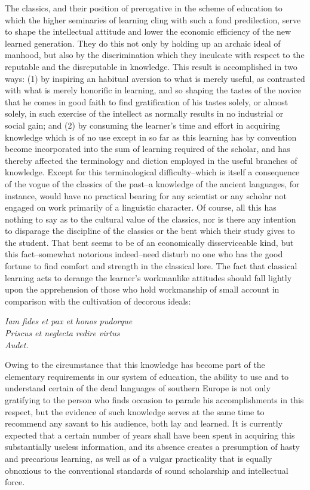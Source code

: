 \documentclass[12pt]{report}
\begin{document}
The classics, and their position of prerogative in the scheme of
education to which the higher seminaries of learning cling with such a
fond predilection, serve to shape the intellectual attitude and lower
the economic efficiency of the new learned generation. They do this
not only by holding up an archaic ideal of manhood, but also by the
discrimination which they inculcate with respect to the reputable and
the disreputable in knowledge. This result is accomplished in two ways:
(1) by inspiring an habitual aversion to what is merely useful, as
contrasted with what is merely honorific in learning, and so shaping the
tastes of the novice that he comes in good faith to find gratification
of his tastes solely, or almost solely, in such exercise of the
intellect as normally results in no industrial or social gain; and (2)
by consuming the learner's time and effort in acquiring knowledge which
is of no use except in so far as this learning has by convention become
incorporated into the sum of learning required of the scholar, and has
thereby affected the terminology and diction employed in the useful
branches of knowledge. Except for this terminological difficulty--which
is itself a consequence of the vogue of the classics of the past--a
knowledge of the ancient languages, for instance, would have no
practical bearing for any scientist or any scholar not engaged on work
primarily of a linguistic character. Of course, all this has nothing to
say as to the cultural value of the classics, nor is there any intention
to disparage the discipline of the classics or the bent which their
study gives to the student. That bent seems to be of an economically
disserviceable kind, but this fact--somewhat notorious indeed--need
disturb no one who has the good fortune to find comfort and strength in
the classical lore. The fact that classical learning acts to derange
the learner's workmanlike attitudes should fall lightly upon the
apprehension of those who hold workmanship of small account in
comparison with the cultivation of decorous ideals: 
\begin{displayquote}
\emph{Iam fides et pax et honos pudorque \\
Priscus et neglecta redire virtus \\
Audet.}
\end{displayquote}
Owing to the circumstance that this knowledge has become part of the
elementary requirements in our system of education, the ability to use
and to understand certain of the dead languages of southern Europe
is not only gratifying to the person who finds occasion to parade his
accomplishments in this respect, but the evidence of such knowledge
serves at the same time to recommend any savant to his audience, both
lay and learned. It is currently expected that a certain number of
years shall have been spent in acquiring this substantially useless
information, and its absence creates a presumption of hasty and
precarious learning, as well as of a vulgar practicality that is
equally obnoxious to the conventional standards of sound scholarship and
intellectual force.
\end{document}
